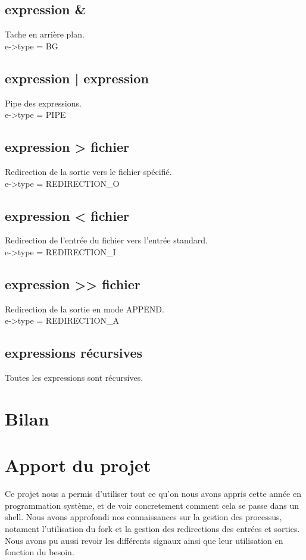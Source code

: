 \documentclass[12pt]{article}
\begin{document}
\subsection{expression \&}
Tache en arrière plan.
\\
e->type = BG

\subsection{expression | expression}
Pipe des expressions.
\\
e->type = PIPE

\subsection{expression > fichier}
Redirection de la sortie vers le fichier spécifié.
\\
e->type = REDIRECTION\_O

\subsection{expression < fichier}
Redirection de l'entrée du fichier vers l'entrée standard.
\\   
e->type = REDIRECTION\_I

\subsection{expression >> fichier}
Redirection de la sortie en mode APPEND.   
\\ 
e->type = REDIRECTION\_A   

\subsection{expressions récursives}
Toutes les expressions sont récursives.

\newpage
\section{Bilan}

\newpage
\section{Apport du projet}
Ce projet nous a permis d'utiliser tout ce qu'on nous avons appris cette année en programmation système, et de voir concretement comment cela se passe dans un shell.
Nous avons approfondi nos connaissances sur la gestion des processus, notament l'utilisation du fork et la gestion des redirections des entrées et sorties.
Nous avons pu aussi revoir les différents signaux ainsi que leur utilisation en fonction du besoin.
\end{document}
